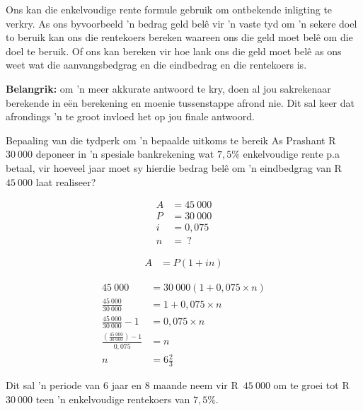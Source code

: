 Ons kan die enkelvoudige rente formule gebruik om ontbekende inligting te verkry. As ons byvoorbeeld 'n bedrag geld bel\^{e} vir 'n vaste tyd om 'n sekere doel to beruik kan ons die rentekoers bereken waareen ons die geld moet bel\^{e} om die doel te beruik. Of ons kan bereken vir hoe lank ons die geld moet bel\^{e} as ons weet wat die aanvangsbedgrag en die eindbedrag en die rentekoers is. 

\par
\textbf{Belangrik:} om 'n meer akkurate antwoord te kry, doen al jou sakrekenaar berekende in e\"en berekening en moenie tussenstappe afrond nie. Dit sal keer dat afrondings 'n te groot invloed het op jou finale antwoord.


\begin{wex}{Bepaaling van die tydperk om 'n bepaalde uitkoms te bereik}
{As Prashant  R~$30~000$ deponeer in ’n spesiale
bankrekening wat $7,5\%$ enkelvoudige rente p.a betaal, vir hoeveel jaar moet
sy hierdie bedrag belê om 'n eindbedgrag van R~$45~000$ laat realiseer?}
{
    \begin{align*}
	A &= 45~000\\
	P &= 30~000\\
	i &= 0,075\\
	n &= ~?
    \end{align*}

    \begin{align*}
	A &= P(1 + in)
    \end{align*}

    \begin{align*}
	45~000 &= 30~000(1 + 0,075 \times n)\\
	\frac{45~000}{30~000} &= 1 + 0,075 \times n\\
	\frac{45~000}{30~000} -1 &= 0,075 \times n\\
	\frac{(\frac{45~000}{30~000}) -1}{0,075} &= n\\
	n &= 6\frac{2}{3}
    \end{align*}

    Dit sal ’n periode van 6 jaar en 8 maande neem vir R~$45~000$ om te groei tot R~$30~000$ teen ’n enkelvoudige rentekoers van $7,5\%$.
    }
\end{wex}




